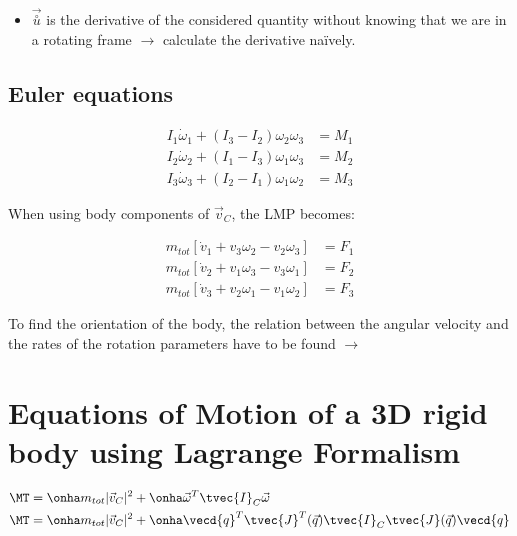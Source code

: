 \documentclass[10pt,a4paper]{scrartcl}
\begin{document}
\begin{multicols*}{2}

\begin{itemize}
\item $\vec{\overset{\circ}{u}}$ is the derivative of the considered quantity without knowing that we are in a rotating frame $\rightarrow$ calculate the derivative naïvely.
\end{itemize}

\subsection{Euler equations}

\begin{align*}
I_1\dot{\omega}_1+(I_3-I_2)\omega_2\omega_3&=M_1\\
I_2\dot{\omega}_2+(I_1-I_3)\omega_1\omega_3&=M_2\\
I_3\dot{\omega}_3+(I_2-I_1)\omega_1\omega_2&=M_3
\end{align*}

When using body components of $\vec{v}_C$, the LMP becomes:



\begin{align*}
m_{tot}\left[\dot{v}_1+v_3\omega_2-v_2\omega_3\right]&=F_1\\
m_{tot}\left[\dot{v}_2+v_1\omega_3-v_3\omega_1\right]&=F_2\\
m_{tot}\left[\dot{v}_3+v_2\omega_1-v_1\omega_2\right]&=F_3
\end{align*}

To find the orientation of the body, the relation between the angular velocity and the rates of the rotation parameters have to be found $\rightarrow$ 


\section{Equations of Motion of a 3D rigid body using Lagrange Formalism}

\begin{align*}
\MT&=\onha m_{tot}|\vec{v}_C|^2+\onha\vec{\omega}^T\tvec{I}_C\vec{\omega}\\
\MT&=\onha m_{tot}|\vec{v}_C|^2+\onha\vecd{q}^T\tvec{J}^T(\vec{q})\tvec{I}_C\tvec{J}(\vec{q})\vecd{q}
\end{align*}


\end{multicols*}
\end{document}
